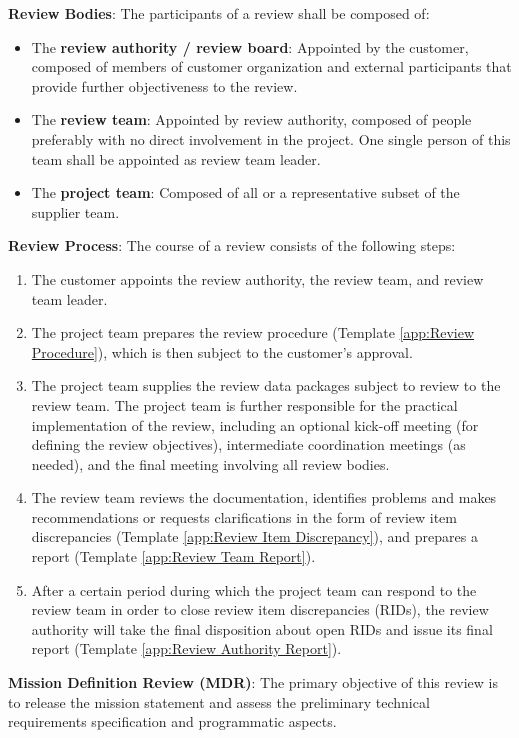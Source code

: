\textbf{Review Bodies}: The participants of a review shall be composed of:
\begin{itemize}
\item The \textbf{review authority / review board}: Appointed by the customer, composed of members of customer organization and external participants that provide further objectiveness to the review.
\item The \textbf{review team}: Appointed by review authority, composed of people preferably with no direct involvement in the project. One single person of this team shall be appointed as review team leader.
\item The \textbf{project team}: Composed of all or a representative subset of the supplier team.
\end{itemize}

\textbf{Review Process}: The course of a review consists of the following steps:
\begin{enumerate}
\item The customer appoints the review authority, the review team, and review team leader.
\item The project team prepares the review procedure (Template \ref{app:Review Procedure}), which is then subject to the customer's approval.
\item The project team supplies the review data packages subject to review to the review team. The project team is further responsible for the practical implementation of the review, including an optional kick-off meeting (for defining the review objectives), intermediate coordination meetings (as needed), and the final meeting involving all review bodies.
\item The review team reviews the documentation, identifies problems and makes recommendations or requests clarifications in the form of review item discrepancies (Template \ref{app:Review Item Discrepancy}), and prepares a report (Template \ref{app:Review Team Report}). 
\item After a certain period during which the project team can respond to the review team in order to close review item discrepancies (RIDs), the review authority will take the final disposition about open RIDs and issue its final report (Template \ref{app:Review Authority Report}).
\end{enumerate}

\textbf{Mission Definition Review (MDR)}: The primary objective of this review is to release the mission statement and assess the preliminary technical requirements specification and programmatic aspects.

